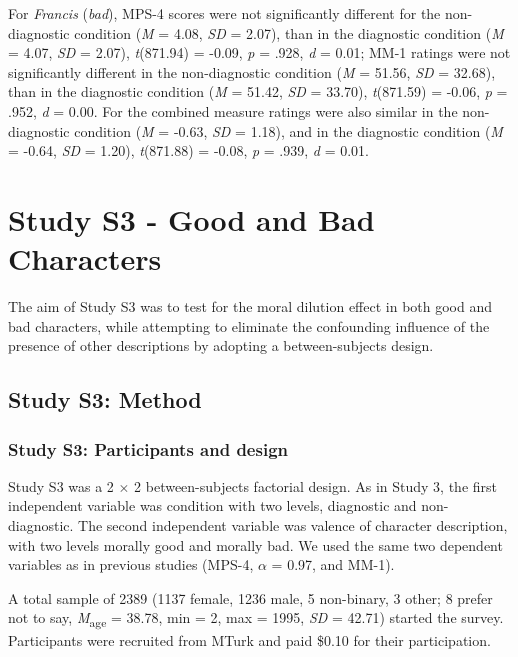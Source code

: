 \documentclass[
  man,floatsintext]{apa6}
\begin{document}
For \emph{Francis} (\emph{bad}), MPS-4 scores were not significantly different for the non-diagnostic condition (\emph{M} = 4.08, \emph{SD} = 2.07), than in the diagnostic condition (\emph{M} = 4.07, \emph{SD} = 2.07), \emph{t}(871.94) = -0.09, \emph{p} = .928, \emph{d} = 0.01; MM-1 ratings were not significantly different in the non-diagnostic condition (\emph{M} = 51.56, \emph{SD} = 32.68), than in the diagnostic condition (\emph{M} = 51.42, \emph{SD} = 33.70), \emph{t}(871.59) = -0.06, \emph{p} = .952, \emph{d} = 0.00. For the combined measure ratings were also similar in the non-diagnostic condition (\emph{M} = -0.63, \emph{SD} = 1.18), and in the diagnostic condition (\emph{M} = -0.64, \emph{SD} = 1.20), \emph{t}(871.88) = -0.08, \emph{p} = .939, \emph{d} = 0.01.

\pagebreak

\section{Study S3 - Good and Bad Characters}\label{study-s3---good-and-bad-characters}

The aim of Study S3 was to test for the moral dilution effect in both good and bad characters, while attempting to eliminate the confounding influence of the presence of other descriptions by adopting a between-subjects design.

\subsection{Study S3: Method}\label{study-s3-method}

\subsubsection{Study S3: Participants and design}\label{study-s3-participants-and-design}

Study S3 was a 2 \(\times\) 2 between-subjects factorial design. As in Study 3, the first independent variable was condition with two levels, diagnostic and non-diagnostic. The second independent variable was valence of character description, with two levels morally good and morally bad. We used the same two dependent variables as in previous studies (MPS-4, \(\alpha\) = 0.97, and MM-1).

A total sample of 2389 (1137 female, 1236 male, 5 non-binary, 3 other; 8 prefer not to say, \emph{M}\textsubscript{age} = 38.78, min = 2, max = 1995, \emph{SD} = 42.71) started the survey. Participants were recruited from MTurk and paid \$0.10 for their participation.
\end{document}

